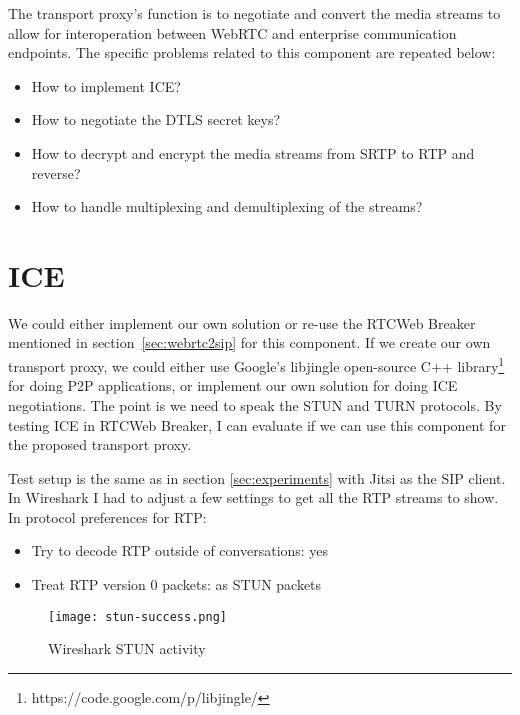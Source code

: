 The transport proxy's function is to negotiate and convert the media streams to allow for interoperation between WebRTC and enterprise communication endpoints. The specific problems related to this component are repeated below:

\begin{itemize}
\item{How to implement ICE?}
\item{How to negotiate the DTLS secret keys?}
\item{How to decrypt and encrypt the media streams from SRTP to RTP and reverse?}
\item{How to handle multiplexing and demultiplexing of the streams?}
\end{itemize}


\section{ICE}
We could either implement our own solution or re-use the RTCWeb Breaker mentioned in section~\ref{sec:webrtc2sip} for this component. If we create our own transport proxy, we could either use Google's libjingle open-source C++ library\footnote{https://code.google.com/p/libjingle/} for doing P2P applications, or implement our own solution for doing ICE negotiations. The point is we need to speak the STUN and TURN protocols. By testing ICE in RTCWeb Breaker, I can evaluate if we can use this component for the proposed transport proxy.

Test setup is the same as in section \ref{sec:experiments} with Jitsi as the SIP client. In Wireshark I had to adjust a few settings to get all the RTP streams to show. In protocol preferences for RTP:
\begin{itemize}
\item Try to decode RTP outside of conversations: yes
\item Treat RTP version 0 packets: as STUN packets
\end{itemize}

\begin{figure}[here]
\centerline{\texttt{[image: stun-success.png]}}
\caption{Wireshark STUN activity}
\label{fig:wireshark-stun-activity}
\end{figure}

